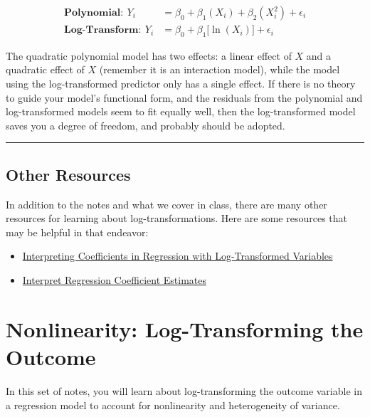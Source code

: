 \documentclass[]{book}
\providecommand{\tightlist}{%
  \setlength{\itemsep}{0pt}\setlength{\parskip}{0pt}}
\begin{document}
\[
\begin{split}
\mathbf{Polynomial:~}Y_i &= \beta_0 + \beta_1(X_i) + \beta_2(X_i^2) +\epsilon_i \\
\mathbf{Log\mbox{-}Transform:~}Y_i &= \beta_0 + \beta_1\bigg[\ln(X_i)\bigg] + \epsilon_i
\end{split}
\]

The quadratic polynomial model has two effects: a linear effect of \(X\) and a quadratic effect of \(X\) (remember it is an interaction model), while the model using the log-transformed predictor only has a single effect. If there is no theory to guide your model's functional form, and the residuals from the polynomial and log-transformed models seem to fit equally well, then the log-transformed model saves you a degree of freedom, and probably should be adopted.

\begin{center}\rule{0.5\linewidth}{\linethickness}\end{center}

\hypertarget{other-resources-1}{%
\section*{Other Resources}\label{other-resources-1}}

In addition to the notes and what we cover in class, there are many other resources for learning about log-transformations. Here are some resources that may be helpful in that endeavor:

\begin{itemize}
\tightlist
\item
  \href{https://www.cscu.cornell.edu/news/statnews/stnews83.pdf}{Interpreting Coefficients in Regression with Log-Transformed Variables}
\item
  \href{http://www.cazaar.com/ta/econ113/interpreting-beta}{Interpret Regression Coefficient Estimates}
\end{itemize}

\hypertarget{nonlinearity-log-transforming-the-outcome}{%
\chapter{Nonlinearity: Log-Transforming the Outcome}\label{nonlinearity-log-transforming-the-outcome}}

In this set of notes, you will learn about log-transforming the outcome variable in a regression model to account for nonlinearity and heterogeneity of variance.
\end{document}
